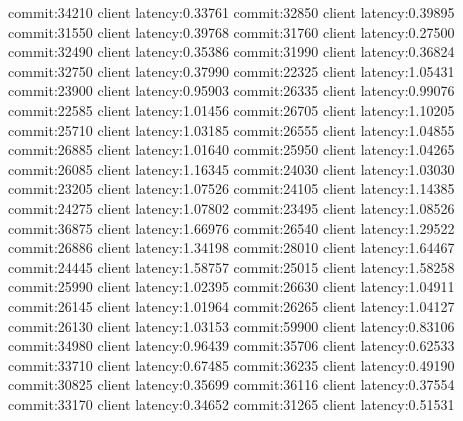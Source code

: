 commit:34210 client latency:0.33761
commit:32850 client latency:0.39895
commit:31550 client latency:0.39768
commit:31760 client latency:0.27500
commit:32490 client latency:0.35386
commit:31990 client latency:0.36824
commit:32750 client latency:0.37990
commit:22325 client latency:1.05431
commit:23900 client latency:0.95903
commit:26335 client latency:0.99076
commit:22585 client latency:1.01456
commit:26705 client latency:1.10205
commit:25710 client latency:1.03185
commit:26555 client latency:1.04855
commit:26885 client latency:1.01640
commit:25950 client latency:1.04265
commit:26085 client latency:1.16345
commit:24030 client latency:1.03030
commit:23205 client latency:1.07526
commit:24105 client latency:1.14385
commit:24275 client latency:1.07802
commit:23495 client latency:1.08526
commit:36875 client latency:1.66976
commit:26540 client latency:1.29522
commit:26886 client latency:1.34198
commit:28010 client latency:1.64467
commit:24445 client latency:1.58757
commit:25015 client latency:1.58258
commit:25990 client latency:1.02395
commit:26630 client latency:1.04911
commit:26145 client latency:1.01964
commit:26265 client latency:1.04127
commit:26130 client latency:1.03153
commit:59900 client latency:0.83106
commit:34980 client latency:0.96439
commit:35706 client latency:0.62533
commit:33710 client latency:0.67485
commit:36235 client latency:0.49190
commit:30825 client latency:0.35699
commit:36116 client latency:0.37554
commit:33170 client latency:0.34652
commit:31265 client latency:0.51531
